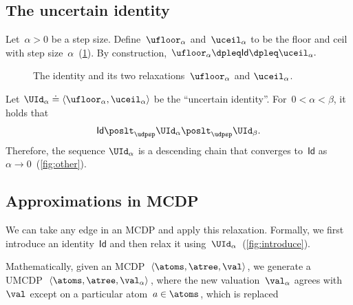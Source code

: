 \subsection{The uncertain identity}

Let~$\alpha>0$ be a step size. Define~$\ufloor_{\alpha}$ and~$\uceil_{\alpha}$
to be the floor and ceil with step size~$\alpha$~(\cref{fig:identity_approximation}).
By construction, $\ufloor_{\alpha}\dpleq\mathsf{Id}\dpleq\uceil_{\alpha}.$

\begin{figure}[h]
    \hfill{}\hfill{}

    \caption{\label{fig:identity_approximation}The identity and its two relaxations~$\ufloor_{\alpha}$
        and $\uceil_{\alpha}$.}
\end{figure}

Let $\UId_{\alpha}\doteq\left\langle \ufloor_{\alpha},\uceil_{\alpha}\right\rangle $
be the ``uncertain identity''. For~$0<\alpha<\beta$, it holds
that
\[
    \mathsf{Id}\poslt_{\udpsp}\UId_{\alpha}\poslt_{\udpsp}\UId_{\beta}.
\]
Therefore, the sequence $\UId_{\alpha}$ is a descending chain that
converges to~$\mathsf{Id}$ as~$\alpha\rightarrow0$~(\cref{fig:other}).


\subsection{Approximations in MCDP}

We can take any edge in an MCDP and apply this relaxation. Formally,
we first introduce an identity~$\mathsf{Id}$ and then relax it using~$\UId_{\alpha}$~(\cref{fig:introduce}).


Mathematically, given an MCDP~$\left\langle \atoms,\atree,\val\right\rangle $,
we generate a UMCDP~$\left\langle \atoms,\atree,\val_{\alpha}\right\rangle $,
where the new valuation~$\val_{\alpha}$ agrees with~$\val$ except
on a particular atom~$a\in\atoms$, which is replaced 